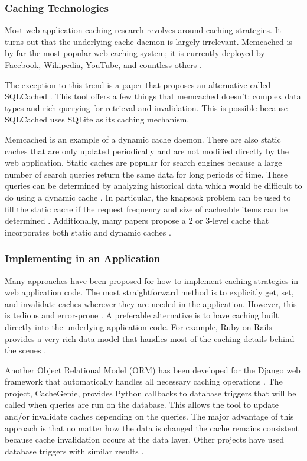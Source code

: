 \documentclass[12pt]{ucthesis}
\begin{document}
\subsubsection{Caching Technologies}
Most web application caching research revolves around caching strategies.
It turns out that the underlying cache daemon is largely irrelevant.
Memcached is by far the most popular web caching system; it is currently deployed by Facebook, Wikipedia, YouTube, and countless others \cite{memcachedDotOrg}.

The exception to this trend is a paper that proposes an alternative called SQLCached \cite{sqlCached}.
This tool offers a few things that memcached doesn't: complex data types and rich querying for retrieval and invalidation.
This is possible because SQLCached uses SQLite as its caching mechanism.

Memcached is an example of a dynamic cache daemon.
There are also static caches that are only updated periodically and are not modified directly by the web application.
Static caches are popular for search engines because a large number of search queries return the same data for long periods of time.
These queries can be determined by analyzing historical data which would be difficult to do using a dynamic cache \cite{designTradeOffsSearchEngine}.
In particular, the knapsack problem can be used to fill the static cache if the request frequency and size of cacheable items can be determined \cite{designTradeOffsSearchEngine}.
Additionally, many papers propose a 2 or 3-level cache that incorporates both static and dynamic caches \cite{cacheAdmissionPolicies}\cite{designTradeOffsSearchEngine}.

\subsubsection{Implementing in an Application}
Many approaches have been proposed for how to implement caching strategies in web application code.
The most straightforward method is to explicitly get, set, and invalidate caches wherever they are needed in the application.
However, this is tedious and error-prone \cite{keyBasedCacheExpiration}\cite{triggerBasedORM}.
A preferable alternative is to have caching built directly into the underlying application code.
For example, Ruby on Rails provides a very rich data model that handles most of the caching details behind the scenes \cite{keyBasedCacheExpiration}.

Another Object Relational Model (ORM) has been developed for the Django web framework that automatically handles all necessary caching operations \cite{triggerBasedORM}.
The project, CacheGenie, provides Python callbacks to database triggers that will be called when queries are run on the database. This allows the tool to update and/or invalidate caches depending on the queries.
The major advantage of this approach is that no matter how the data is changed the cache remains consistent because cache invalidation occurs at the data layer.
Other projects have used database triggers with similar results \cite{scalableConsistentCaching}.
\end{document}
